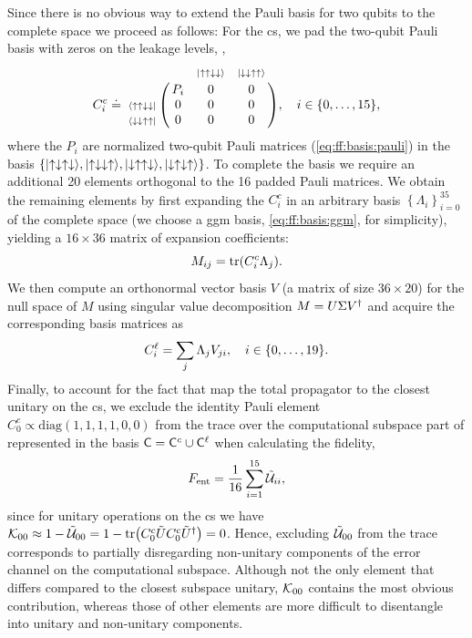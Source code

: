 Since there is no obvious way to extend the Pauli basis for two qubits to the complete space we proceed as follows: For the \gls{cs}, we pad the two-qubit Pauli basis with zeros on the leakage levels, \ie,
\begin{equation}\label{eq:ff:basis:cnot}
    C_i^c\doteq\bordermatrix{~                     &     & \scriptsize{\ketuudd} & \scriptsize{\ketdduu} \cr
                                                   & P_i & 0                     & 0                     \cr
                             \scriptsize{\brauudd} & 0   & 0                     & 0                     \cr
                             \scriptsize{\bradduu} & 0   & 0                     & 0                     \cr}
    \qcomma{i\in\{0,\dotsc,15\}},
\end{equation}
where the $P_i$ are normalized two-qubit Pauli matrices (\cf \cref{eq:ff:basis:pauli}) in the basis $\lbrace\mbox{\ensuremath{\ket{\uparrow\downarrow\uparrow\downarrow}}},\mbox{\ensuremath{\ket{\uparrow\downarrow\downarrow\uparrow}}},\mbox{\ensuremath{\ket{\downarrow\uparrow\uparrow\downarrow}}},\mbox{\ensuremath{\ket{\downarrow\uparrow\downarrow\uparrow}}}\rbrace$.
To complete the basis we require an additional 20 elements orthogonal to the 16 padded Pauli matrices.
We obtain the remaining elements by first expanding the $C_i^c$ in an arbitrary basis $\left\lbrace\Lambda_i\right\rbrace_{i=0}^{35}$ of the complete space (we choose a \gls{ggm} basis, \cref{eq:ff:basis:ggm}, for simplicity), yielding a $16\times 36$ matrix of expansion coefficients:
\begin{equation}
    M_{ij} = \tr(C_i^c\Lambda_j).
\end{equation}
We then compute an orthonormal vector basis $V$ (a matrix of size $36\times 20$) for the null space of $M$ using singular value decomposition $M = U\Sigma V^\dagger$ and acquire the corresponding basis matrices as
\begin{equation}
    C_i^\ell = \sum_j\Lambda_j V_{ji}\qcomma{i\in\lbrace 0,\dotsc,19\rbrace}.
\end{equation}
Finally, to account for the fact that \citet{Cerfontaine2020} map the total propagator to the closest unitary on the \gls{cs}, we exclude the identity Pauli element $C_0^c\propto\text{diag}(1, 1, 1, 1, 0, 0)$ from the trace over the computational subspace part of \liouvUe represented in the basis $\mathsf{C} = \mathsf{C}^c\cup\mathsf{C}^\ell$ when calculating the fidelity,
\begin{equation}
    F_{\mathrm{ent}} = \frac{1}{16}\sum_{i=1}^{15}\mathcal{\tilde{U}}_{ii},
\end{equation}
since for unitary operations on the \gls{cs} we have $\mathcal{K}_{00} \approx 1 - \mathcal{\tilde{U}}_{00} = 1 - \mathrm{tr}\bigl(C_0^c\tilde{U} C_0^c\tilde{U}^\dagger\bigr) = 0$.
Hence, excluding $\mathcal{\tilde{U}}_{00}$ from the trace corresponds to partially disregarding non-unitary components of the error channel on the computational subspace.
Although not the only element that differs compared to the closest subspace unitary, $\mathcal{K}_{00}$ contains the most obvious contribution, whereas those of other elements are more difficult to disentangle into unitary and non-unitary components.


